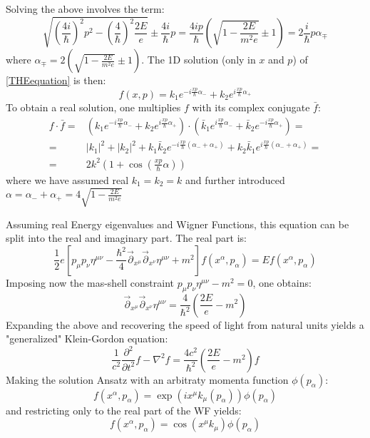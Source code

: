 \documentclass[a4paper,10pt]{article}
\numberwithin{equation}{section}
\newcommand{\parr}{\overset{\rightarrow}{\partial}}
\begin{document}
Solving the above involves the term:
\begin{equation}
    \sqrt{\left( \frac{4i}{\hbar}\right)^2 p^2 - \left( \frac{4}{\hbar} \right)^2 \frac{2E}{e}} \pm \frac{4i}{\hbar}p = \frac{4ip}{\hbar} \left( \sqrt{ 1 - \frac{2E}{m^2 e}} \pm 1\right) = 2 \frac{i}{\hbar} p \alpha_\mp 
\end{equation}
where $\alpha_\mp = 2 \left( \sqrt{1 - \frac{2E}{m^2 e}} \pm 1\right)$. The 1D solution (only in $x$ and $p$) of \ref{THEequation} is then:
\begin{equation}
    f(x,p) =  k_1 e^{-i\frac{xp}{\hbar}\alpha_-} + k_2 e^{i\frac{xp}{\hbar}\alpha_+}
\end{equation}
To obtain a real solution, one multiplies $f$ with its complex conjugate $\bar{f}$:
\begin{align}
    f \cdot  \bar{f} = & \left( k_1 e^{-i\frac{xp}{\hbar}\alpha_-} + k_2 e^{i\frac{xp}{\hbar}\alpha_+}\right) \cdot \left( \bar{k}_1 e^{i\frac{xp}{\hbar}\alpha_-} + \bar{k}_2 e^{-i\frac{xp}{\hbar}\alpha_+}\right) =\\
    = & |k_1|^2 + |k_2|^2 + k_1 \bar{k}_2 e^{-i\frac{xp}{\hbar}(\alpha_- + \alpha_+)} +  k_2 \bar{k}_1 e^{i\frac{xp}{\hbar}(\alpha_- + \alpha_+)} =\\
    = & 2 k^2 \left( 1 + \cos{\left(\frac{xp}{\hbar} \alpha\right)} \right)
\end{align}
where we have assumed real $k_1 = k_2 = k$ and further introduced $\alpha = \alpha_- + \alpha_+ = 4 \sqrt{1 - \frac{2E}{m^2 e}} $

\iffalse


Assuming real Energy eigenvalues and Wigner Functions, this equation can be split into the real and imaginary part. The real part is:
\begin{equation}
    \frac{1}{2}e \left[ p_\mu p_\nu \eta^{\mu\nu}  - \frac{\hbar^2}{4}\parr_{x^\mu}\parr_{x^\nu} \eta^{\mu\nu} + m^2 \right] f \left(x^\alpha,p_\alpha \right) = E f\left(x^\alpha,p_\alpha \right)
\end{equation}
Imposing now the mas-shell constraint $p_\mu p_\nu \eta^{\mu\nu} - m^2 = 0$, one obtains:
\begin{equation}
    \parr_{x^\mu}\parr_{x^\nu} \eta^{\mu\nu} = \frac{4}{\hbar^2} \left( \frac{2E}{e} - m^2 \right)
\end{equation}
Expanding the above and recovering the speed of light from natural units yields a "generalized" Klein-Gordon equation:
\begin{equation}
    \frac{1}{c^2}\frac{\partial^2}{\partial t^2} f - \nabla ^2 f = \frac{4 c^2}{\hbar^2} \left( \frac{2E}{e} - m^2 \right) f
    \label{realpartofEQ}
\end{equation}
Making the solution Ansatz with an arbitraty momenta function $\phi(p_\alpha)$:
\begin{equation}
    f\left(x^\alpha,p_\alpha \right) = \exp (i x^\mu k_\mu (p_\alpha) ) \phi(p_\alpha)
\end{equation}
and restricting only to the real part of the WF yields:
\begin{equation}
    f\left(x^\alpha,p_\alpha \right) = \cos (x^\mu k_\mu ) \phi(p_\alpha)
\end{equation}
\end{document}
